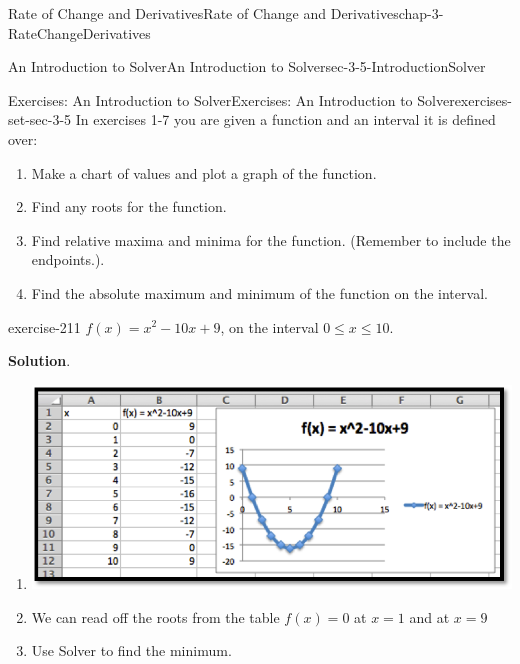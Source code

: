 \documentclass[oneside,10pt,]{book}
\numberwithin{equation}{section}
\begin{document}
\begin{chapterptx}{Rate of Change and Derivatives}{}{Rate of Change and Derivatives}{}{}{chap-3-RateChangeDerivatives}
\begin{sectionptx}{An Introduction to Solver}{}{An Introduction to Solver}{}{}{sec-3-5-IntroductionSolver}
\begin{exercises-subsection-numberless}{Exercises: An Introduction to Solver}{}{Exercises: An Introduction to Solver}{}{}{exercises-set-sec-3-5}
\hypertarget{p-1362}{}%
In exercises 1-7 you are given a function and an interval it is defined over:%
\leavevmode%
\begin{enumerate}[label=(\alph*)]
\item\hypertarget{li-421}{}\hypertarget{p-1363}{}%
Make a chart of values and plot a graph of the function.%
\item\hypertarget{li-422}{}\hypertarget{p-1364}{}%
Find any roots for the function.%
\item\hypertarget{li-423}{}\hypertarget{p-1365}{}%
Find relative maxima and minima for the function.  (Remember to include the endpoints.).%
\item\hypertarget{li-424}{}\hypertarget{p-1366}{}%
Find the absolute maximum and minimum of the function on the interval.%
\end{enumerate}
\begin{divisionexercise}{1}{}{}{exercise-211}%
\hypertarget{p-1367}{}%
\(f(x)=x^2-10x+9\), on the interval \(0\le x\le 10\).%
\par\smallskip%
\noindent\textbf{Solution}.\hypertarget{solution-105}{}\quad%
\leavevmode%
\begin{enumerate}[label=(\alph*)]
\item\hypertarget{li-425}{}\leavevmode%
\begin{sidebyside}{1}{0.15}{0.15}{0}%
\begin{sbspanel}{0.7}%
\includegraphics[width=1\linewidth]{images/sec3-5-sol1a.png}
\end{sbspanel}%
\end{sidebyside}%
%
\item\hypertarget{li-426}{}\hypertarget{p-1368}{}%
We can read off the roots from the table \(f(x)=0\) at \(x = 1\) and at \(x = 9\)%
\item\hypertarget{li-427}{}\hypertarget{p-1369}{}%
Use Solver to find the minimum.%
\begin{sidebyside}{1}{0.25}{0.25}{0}%
\begin{sbspanel}{0.5}%

\end{sbspanel}
\end{sidebyside}
\end{enumerate}
\end{divisionexercise}
\end{exercises-subsection-numberless}
\end{sectionptx}
\end{chapterptx}
\end{document}
